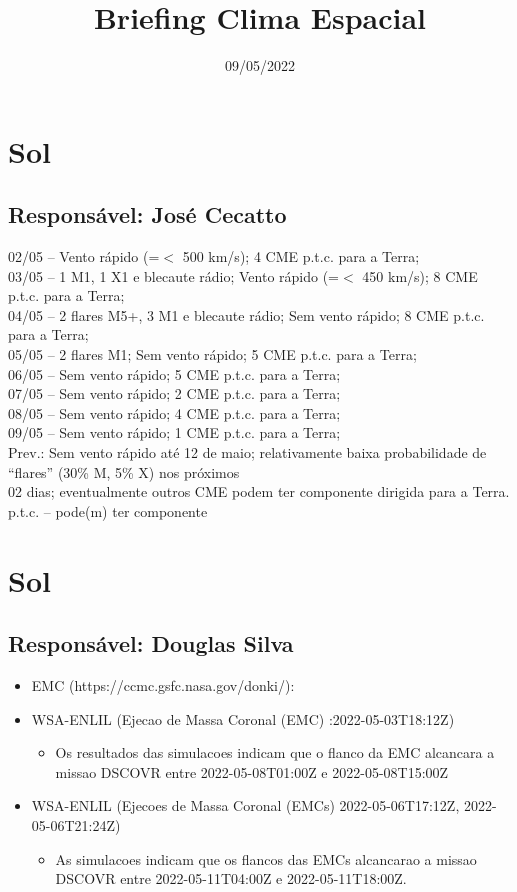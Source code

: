 \documentclass[a4paper, 10pt]{article}
\title{\Large{\textbf{Briefing Clima Espacial}}}
\date{09/05/2022}
\begin{document}
\maketitle 

  \thispagestyle{fancy} \section{Sol} 
 \subsection{Responsável: José Cecatto}

02/05 – Vento rápido (=$<$ 500 km/s); 4 CME p.t.c. para a Terra; \\ 03/05 – 1 M1, 1 X1 e blecaute rádio; Vento rápido (=$<$ 450 km/s); 8 CME p.t.c. para a Terra; \\ 04/05 – 2 flares M5+, 3 M1 e blecaute rádio; Sem vento rápido; 8 CME p.t.c. para a Terra;  \\ 05/05 – 2 flares M1; Sem vento rápido; 5 CME p.t.c. para a Terra;  \\ 06/05 – Sem vento rápido; 5 CME p.t.c. para a Terra; \\ 07/05 – Sem vento rápido; 2 CME p.t.c. para a Terra; \\ 08/05 – Sem vento rápido; 4 CME p.t.c. para a Terra; \\ 09/05 – Sem vento rápido; 1 CME p.t.c. para a Terra; \\ Prev.: Sem vento rápido até 12 de maio; relativamente baixa probabilidade de “flares” (30\% M, 5\% X) nos próximos \\ 02 dias; eventualmente outros CME podem ter componente dirigida para a Terra. \\ p.t.c. – pode(m) ter componente\section{Sol} 
 \subsection{Responsável: Douglas Silva}

\begin{itemize} 
 \item EMC (https://ccmc.gsfc.nasa.gov/donki/):
\item WSA-ENLIL (Ejecao de Massa Coronal (EMC) :2022-05-03T18:12Z)
\begin{itemize} 
 \item Os resultados das simulacoes indicam que o flanco da EMC alcancara a missao DSCOVR entre 2022-05-08T01:00Z e 2022-05-08T15:00Z
\end{itemize} 
 \item WSA-ENLIL (Ejecoes de Massa Coronal (EMCs) 2022-05-06T17:12Z, 2022-05-06T21:24Z)
\begin{itemize} 
 \item As simulacoes indicam que os flancos das EMCs alcancarao a missao DSCOVR entre 2022-05-11T04:00Z e 2022-05-11T18:00Z. 
\end{itemize} 
 \end{itemize} 
 
\end{document}

